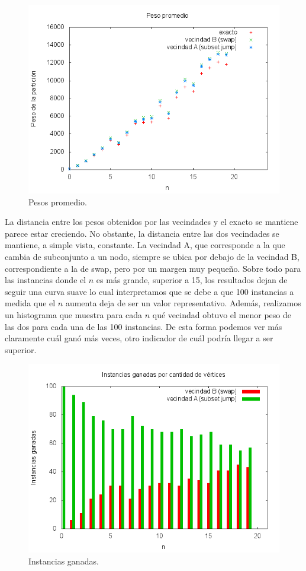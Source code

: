 \begin{figure}[H]
		\centering
		\includegraphics[width=\textwidth]{calidad_trendline.png}
		\caption{Pesos promedio.}
		\label{fig:ej3_ejemplo}
\end{figure}

La distancia entre los pesos obtenidos por las vecindades y el exacto se mantiene parece estar creciendo.
No obstante, la distancia entre las dos vecindades se mantiene, a simple vista, constante. La vecindad A, que
corresponde a la que cambia de subconjunto a un nodo, siempre se ubica por debajo de la vecindad B, correspondiente
a la de swap, pero por un margen muy pequeño. Sobre todo para las instancias donde el $n$ es más grande, superior
a 15, los resultados dejan de seguir una curva suave lo cual interpretamos que se debe a que 100 instancias a medida
que el $n$ aumenta deja de ser un valor representativo.
Además, realizamos un histograma que muestra para cada $n$ qué vecindad obtuvo el menor peso de las dos para cada una
de las 100 instancias. De esta forma podemos ver más claramente cuál ganó más veces, otro indicador de cuál podría
llegar a ser superior.

\begin{figure}[H]
		\centering
		\includegraphics[width=\textwidth]{calidad_histograma.png}
		\caption{Instancias ganadas.}
		\label{fig:ej3_ejemplo}
\end{figure}

